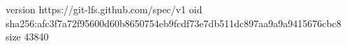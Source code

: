 version https://git-lfs.github.com/spec/v1
oid sha256:afc3f7a72f95600d60b8650754eb9fcdf73e7db511dc897aa9a9a9415676cbc8
size 43840
